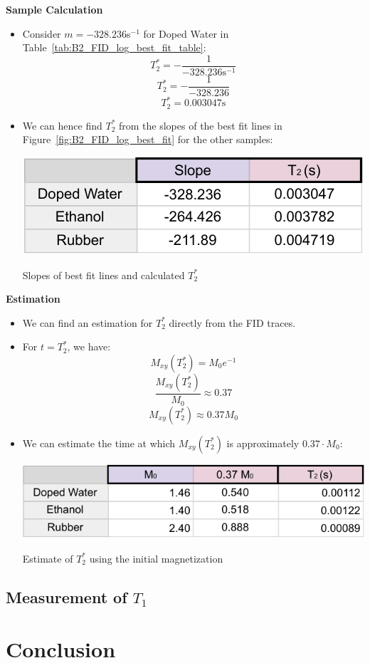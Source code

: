 \documentclass{article}
\begin{document}
\textbf{Sample Calculation}
\begin{itemize}
    \item Consider $m = -328.236$s$^{-1}$ for Doped Water in Table~\ref{tab:B2_FID_log_best_fit_table}:
    \[ T_2^* = -\frac{1}{-328.236\text{s}^{-1}} \]
    \[ T_2^* = -\frac{1}{-328.236}\]
    \[ T_2^* = 0.003047\text{s} \]
    \item We can hence find $T_2^*$ from the slopes of the best fit lines in Figure~\ref{fig:B2_FID_log_best_fit} for the other samples:
    \begin{table}[h]
        \centering
        \includegraphics[scale = 0.78]{../images/B2_T2-crop}
        \caption{Slopes of best fit lines and calculated $T_2^*$}
        \label{tab:B2_FID_log_best_fit_table}
    \end{table}
\end{itemize}
\textbf{Estimation}
\begin{itemize}
    \item We can find an estimation for $T_2^*$ directly from the FID traces.
    \item For $t = T_2^*$, we have:
    \[ M_{xy}(T_2^*) = M_0 e^{-1} \]
    \[ \frac{M_{xy}(T_2^*)}{M_0} \approx 0.37 \]
    \[ M_{xy}(T_2^*) \approx 0.37 M_0 \]
    \item We can estimate the time at which $M_{xy}(T_2^*)$ is approximately $0.37 \cdot M_0$:
    \begin{table}[h]
        \centering
        \includegraphics[scale = 0.78]{../images/B2_slopes_estimate-crop}
        \caption{Estimate of $T_2^*$ using the initial magnetization}
        \label{tab:B2_FID_log_best_fit_table_estimate}
    \end{table}
\end{itemize}

\subsection{Measurement of $T_1$}

\newpage

\section{Conclusion}\label{sec:conclusion}
\end{document}
